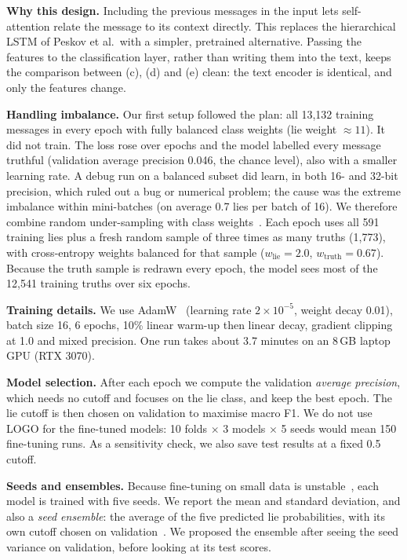 \documentclass[conference]{IEEEtran}
\begin{document}
\textbf{Why this design.} Including the previous messages in the input lets self-attention relate the message to its context directly. This replaces the hierarchical LSTM of Peskov et al.\ with a simpler, pretrained alternative. Passing the features to the classification layer, rather than writing them into the text, keeps the comparison between (c), (d) and (e) clean: the text encoder is identical, and only the features change.

\textbf{Handling imbalance.} Our first setup followed the plan: all 13,132 training messages in every epoch with fully balanced class weights (lie weight $\approx 11$). It did not train. The loss rose over epochs and the model labelled every message truthful (validation average precision 0.046, the chance level), also with a smaller learning rate. A debug run on a balanced subset did learn, in both 16- and 32-bit precision, which ruled out a bug or numerical problem; the cause was the extreme imbalance within mini-batches (on average 0.7 lies per batch of 16). We therefore combine random under-sampling with class weights~\cite{he2009imbalanced}. Each epoch uses all 591 training lies plus a fresh random sample of three times as many truths (1,773), with cross-entropy weights balanced for that sample ($w_{\text{lie}} = 2.0$, $w_{\text{truth}} = 0.67$). Because the truth sample is redrawn every epoch, the model sees most of the 12,541 training truths over six epochs.

\textbf{Training details.} We use AdamW~\cite{loshchilov2019adamw} (learning rate $2\times10^{-5}$, weight decay 0.01), batch size 16, 6 epochs, 10\% linear warm-up then linear decay, gradient clipping at 1.0 and mixed precision. One run takes about 3.7 minutes on an 8\,GB laptop GPU (RTX 3070).

\textbf{Model selection.} After each epoch we compute the validation \emph{average precision}, which needs no cutoff and focuses on the lie class, and keep the best epoch. The lie cutoff is then chosen on validation to maximise macro F1. We do not use LOGO for the fine-tuned models: 10 folds $\times$ 3 models $\times$ 5 seeds would mean 150 fine-tuning runs. As a sensitivity check, we also save test results at a fixed 0.5 cutoff.

\textbf{Seeds and ensembles.} Because fine-tuning on small data is unstable~\cite{dodge2020finetuning,mosbach2021stability}, each model is trained with five seeds. We report the mean and standard deviation, and also a \emph{seed ensemble}: the average of the five predicted lie probabilities, with its own cutoff chosen on validation~\cite{lakshminarayanan2017ensembles}. We proposed the ensemble after seeing the seed variance on validation, before looking at its test scores.
\end{document}
